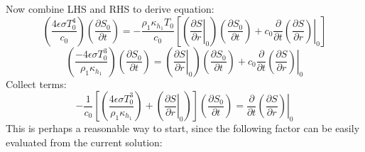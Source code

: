 Now combine LHS and RHS to derive equation:
\begin{equation}
\left( \frac{4 \epsilon \sigma T_0^4}{c_0} \right) \left(\frac{\partial S_0}{\partial t} \right) = - \frac{\rho_1 \kappa_{h_1} T_0}{c_0} \left[ \left(\left.\frac{\partial S}{\partial r}\right|_0 \right) \left( \frac{\partial S_0}{\partial t} \right) + c_0 \frac{\partial}{\partial t} \left. \left(\frac{\partial S}{\partial r}\right) \right|_0  \right]
\end{equation}
\begin{equation}
\left( \frac{-4 \epsilon \sigma T_0^3}{\rho_1 \kappa_{h_1}} \right) \left(\frac{\partial S_0}{\partial t} \right) = \left(\left.\frac{\partial S}{\partial r}\right|_0 \right) \left( \frac{\partial S_0}{\partial t} \right) + c_0 \frac{\partial}{\partial t} \left. \left(\frac{\partial S}{\partial r}\right) \right|_0
\end{equation}
Collect terms:
\begin{equation}
-\frac{1}{c_0} \left[ \left( \frac{4 \epsilon \sigma T_0^3}{\rho_1 \kappa_{h_1}} \right) + \left(\left.\frac{\partial S}{\partial r}\right|_0 \right) \right] \left(\frac{\partial S_0}{\partial t} \right) = \frac{\partial}{\partial t} \left. \left(\frac{\partial S}{\partial r}\right) \right|_0
\end{equation}
This is perhaps a reasonable way to start, since the following factor can be easily evaluated from the current solution:
